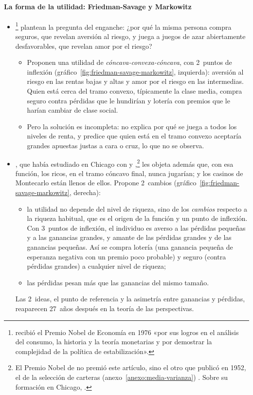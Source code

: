 \documentclass[11pt]{article}
\begin{document}
\paragraph{La forma de la utilidad: Friedman-Savage y Markowitz}

\begin{itemize}
\item \textcite{FriedmanSavage1948Utility}\footnote{ recibió el Premio Nobel de Economía en 1976 «por sus logros en el análisis del consumo, la historia y la teoría monetarias y por demostrar la complejidad de la política de estabilización»\nocite{Nobel1976Friedman}.} plantean la pregunta del enganche: ¿por qué la misma persona compra seguros, que revelan aversión al riesgo, y juega a juegos de azar abiertamente desfavorables, que revelan amor por el riesgo?
  \begin{itemize}
  \item Proponen una utilidad de  \emph{cóncava-convexa-cóncava}, con 2~puntos de inflexión (gráfico~\ref{fig:friedman-savage-markowitz}, izquierda): aversión al riesgo en las rentas bajas y altas y amor por el riesgo en las intermedias. Quien está cerca del tramo convexo, típicamente la clase media, compra seguro contra pérdidas que le hundirían y lotería con premios que le harían cambiar de clase social.
  \item Pero la solución es incompleta: no explica por qué se juega a todos los niveles de renta, y predice que quien está en el tramo convexo aceptaría grandes apuestas justas a cara o cruz, lo que no se observa.
  \end{itemize}
\item \textcite{Markowitz1952Utility}, que había estudiado en Chicago con  y ,\footnote{El Premio Nobel de  no premió este artículo, sino el otro que publicó en 1952, el de la selección de carteras (anexo~\ref{anexo:media-varianza}) . Sobre su formación en Chicago, \textcite{Markowitz1990Biografia}.} les objeta además que, con esa función, los ricos, en el tramo cóncavo final, nunca jugarían; y los casinos de Montecarlo están llenos de ellos. Propone 2~cambios (gráfico~\ref{fig:friedman-savage-markowitz}, derecha):
  \begin{itemize}
  \item la utilidad no depende del nivel de riqueza, sino de los \emph{cambios} respecto a la riqueza habitual, que es el origen de la función y un punto de inflexión. Con 3~puntos de inflexión, el individuo es averso a las pérdidas pequeñas y a las ganancias grandes, y amante de las pérdidas grandes y de las ganancias pequeñas. Así se compra lotería (una ganancia pequeña de esperanza negativa con un premio poco probable) y seguro (contra pérdidas grandes) a cualquier nivel de riqueza;
  \item las pérdidas pesan más que las ganancias del mismo tamaño.
  \end{itemize}
  Las 2~ideas, el punto de referencia y la asimetría entre ganancias y pérdidas, reaparecen 27~años después en la teoría de las perspectivas.
\end{itemize}
\end{document}
